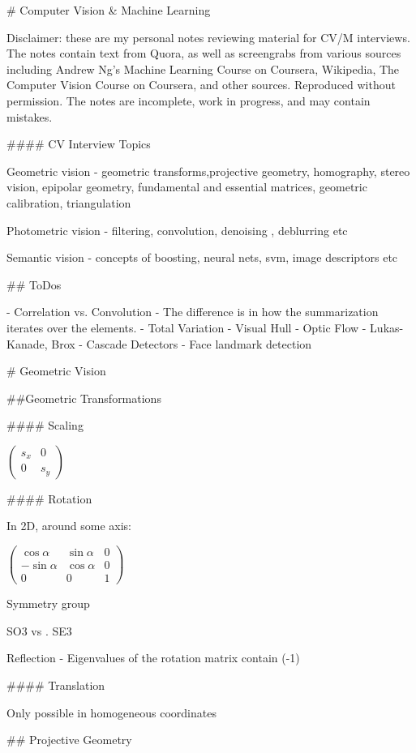 # Computer Vision & Machine Learning

Disclaimer: these are my personal notes reviewing material for CV/M interviews. The notes contain text from Quora, as well as screengrabs from various sources including Andrew Ng's Machine Learning Course on Coursera, Wikipedia, The Computer Vision Course on Coursera, and other sources. Reproduced without permission. The notes are incomplete, work in progress, and may contain mistakes.

#### CV Interview Topics

Geometric vision - geometric transforms,projective geometry, homography, stereo vision, epipolar geometry, fundamental and essential matrices, geometric calibration, triangulation

Photometric vision - filtering, convolution, denoising , deblurring etc

Semantic vision - concepts of boosting, neural nets, svm,  image descriptors etc

## ToDos

- Correlation vs. Convolution
- The difference is in how the summarization iterates over the elements.
- Total Variation
- Visual Hull
- Optic Flow - Lukas-Kanade, Brox
- Cascade Detectors
- Face landmark detection


# Geometric Vision

##Geometric Transformations

#### Scaling 

$\left(  \begin{matrix} s_x & 0 \\ 0 & s_y  \end{matrix} \right)$

#### Rotation

In 2D, around some axis: 

$\left(  \begin{matrix} \cos  \alpha & \sin \alpha  & 0 \\  -\sin \alpha & \cos \alpha & 0 \\ 0 & 0 & 1  \end{matrix} \right)$

Symmetry group 

SO3 vs . SE3

Reflection - Eigenvalues of the rotation matrix contain (-1)

#### Translation

Only possible in homogeneous coordinates

## Projective Geometry

